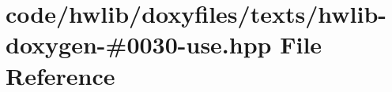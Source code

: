 \hypertarget{hwlib-doxygen-#0030-use_8hpp}{}\section{code/hwlib/doxyfiles/texts/hwlib-\/doxygen-\/\#0030-\/use.hpp File Reference}
\label{hwlib-doxygen-#0030-use_8hpp}
